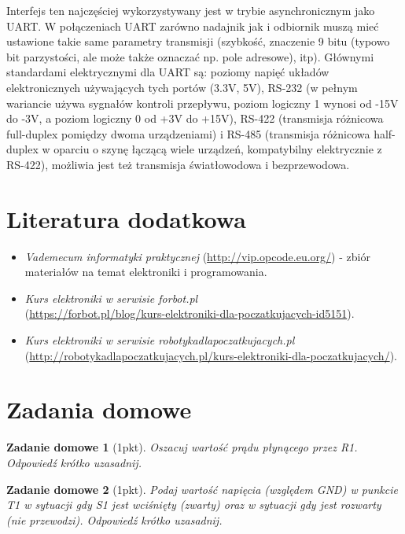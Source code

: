 \documentclass{pdfBooklets}
\begin{document}
    Interfejs ten najczęściej wykorzystywany jest w trybie asynchronicznym jako UART. W połączeniach UART zarówno nadajnik jak i odbiornik muszą mieć ustawione takie same parametry transmisji (szybkość, znaczenie 9 bitu (typowo bit parzystości, ale może także oznaczać np. pole adresowe), itp).
    Głównymi standardami elektrycznymi dla UART są: poziomy napięć układów elektronicznych używających tych portów (3.3V, 5V), RS-232 (w pełnym wariancie używa sygnałów kontroli przepływu, poziom logiczny 1 wynosi od -15V do -3V, a poziom logiczny 0 od +3V do +15V), RS-422 (transmisja różnicowa full-duplex pomiędzy dwoma urządzeniami) i RS-485 (transmisja różnicowa half-duplex w oparciu o szynę łączącą wiele urządzeń, kompatybilny elektrycznie z RS-422), możliwia jest też transmisja światłowodowa i bezprzewodowa.

\section{Literatura dodatkowa}

\begin{itemize}
\item \emph{Vademecum informatyki praktycznej} (\url{http://vip.opcode.eu.org/}) - zbiór materiałów na temat elektroniki i programowania.
\item \emph{Kurs elektroniki w serwisie \emph{forbot.pl}}\\ (\url{https://forbot.pl/blog/kurs-elektroniki-dla-poczatkujacych-id5151}).
\item \emph{Kurs elektroniki w serwisie \emph{robotykadlapoczatkujacych.pl}}\\ (\url{http://robotykadlapoczatkujacych.pl/kurs-elektroniki-dla-poczatkujacych/}).
\end{itemize}

\clearpage
\section{Zadania domowe}
\newtheorem{ZadanieDomowe}{Zadanie domowe}

\begin{ZadanieDomowe} [1pkt]
Oszacuj wartość prądu płynącego przez R1. Odpowiedź krótko uzasadnij.
\end{ZadanieDomowe}

\begin{ZadanieDomowe} [1pkt]
Podaj wartość napięcia (względem GND) w punkcie T1 w sytuacji gdy S1 jest wciśnięty (zwarty) oraz w sytuacji gdy jest rozwarty (nie przewodzi). Odpowiedź krótko uzasadnij.
\end{ZadanieDomowe}
\end{document}
